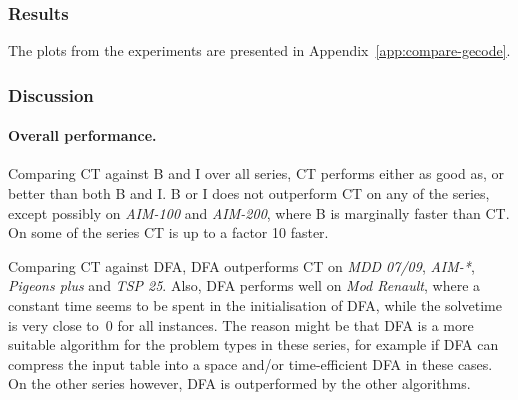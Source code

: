 \documentclass[a4paper,11pt]{article}
\numberwithin{equation}{section}
\begin{document}

\subsubsection{Results}

The plots from the experiments are presented in Appendix~\ref{app:compare-gecode}.


\subsubsection{Discussion}


\paragraph{Overall performance.}
Comparing CT against B and I over all series, CT performs either as good as,
or better than both B and I. 
B or I does not outperform CT on any of the series, except possibly
on \emph{AIM-100} and \emph{AIM-200}, where B is marginally faster than CT.
On some of the series CT is up to a factor 10 faster.

Comparing CT against DFA, DFA outperforms CT on \emph{MDD 07/09},
\emph{AIM-*}, \emph{Pigeons plus} and \emph{TSP 25}.
Also, DFA performs well on \emph{Mod Renault}, where a constant
time seems to be spent in the initialisation of DFA, while
the solvetime is very close to~$0$ for all instances.
The reason might be that DFA is a more suitable algorithm for the
problem types in these series, for example if DFA can
compress the input table into a space and/or time-efficient DFA
in these cases. On the other series however, DFA is outperformed
by the other algorithms.

\end{document}
